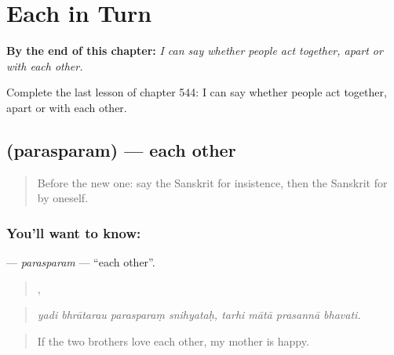 
\chapter{Each in Turn}
\label{ch:sa-each-in-turn}

\begin{chapteropening}
\textbf{By the end of this chapter:} \emph{I can say whether people act together, apart or with each other.}

Complete the last lesson of chapter 544: I can say whether people act together, apart or with each other.
\end{chapteropening}

\section[\texorpdfstring{\sk{परस्परम्} (parasparam)}{परस्परम् (parasparam)}]{ (parasparam) — each other}

\label{lesson:SA-C544-parasparam}



\begin{quote}
Before the new one: say the Sanskrit for insistence, then the Sanskrit for by oneself.
\end{quote}

\subsection*{You'll want to know: }
\textbf{} — \emph{parasparam} — \textquotedblleft{}each other\textquotedblright{}.

\begin{quote}
   ,    
\end{quote}

\begin{quote}
\emph{yadi bhrātarau parasparaṃ snihyataḥ, tarhi mātā prasannā bhavati.}
\end{quote}

\begin{quote}
If the two brothers love each other, my mother is happy.
\end{quote}

